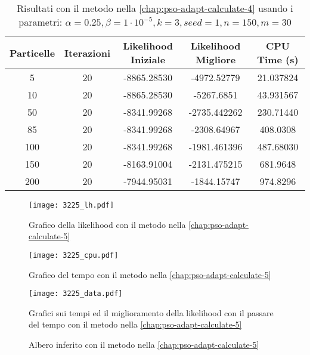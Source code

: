 \begin{table}[!h]
  \centering
  \begin{tabular}{*{5}{c}}
    Particelle & Iterazioni & Likelihood Iniziale & Likelihood Migliore & CPU Time (s) \\ \midrule \midrule
    5 & 20 & -8865.28530 & -4972.52779 & 21.037824 \\
    10 & 20 & -8865.28530 & -5267.6851 & 43.931567 \\
    50 & 20 & -8341.99268 & -2735.442262 & 230.71440 \\
    85 & 20 & -8341.99268 & -2308.64967 & 408.0308 \\
    100 & 20 & -8341.99268 & -1981.461396 & 487.68030 \\
    150 & 20 & -8163.91004 & -2131.475215 & 681.9648 \\
    200 & 20 & -7944.95031 & -1844.15747 & 974.8296 \\
  \end{tabular}
  \caption{Risultati con il metodo nella \autoref{chap:pso-adapt-calculate-4} usando i parametri: $\alpha = 0.25, \beta = 1\cdot 10^{-5}, k = 3, seed = 1, n = 150, m = 30$}
  \label{tab:pso-adapt-calculate-5-table}
\end{table}

\begin{figure}[!h]
  \centering
  \begin{minipage}{.45 \textwidth}
  \centering
  \texttt{[image: 3225\_lh.pdf]}
  \caption{Grafico della likelihood con il metodo nella \autoref{chap:pso-adapt-calculate-5}}
  \end{minipage}
  \begin{minipage}{.45 \textwidth}
    \centering
    \texttt{[image: 3225\_cpu.pdf]}
    \caption{Grafico del tempo con il metodo nella \autoref{chap:pso-adapt-calculate-5}}
  \end{minipage}
  \label{fig:pso-adapt-calculate-1-graph}
\end{figure}

\begin{figure}[!h]
  \centering
  \texttt{[image: 3225\_data.pdf]}
  \caption{Grafici sui tempi ed il miglioramento della likelihood con il passare del tempo con il metodo nella \autoref{chap:pso-adapt-calculate-5}}
  \label{fig:pso-adapt-calculate-4-data}
\end{figure}

\begin{figure}[!h]
  \centering
  \caption{Albero inferito con il metodo nella \autoref{chap:pso-adapt-calculate-5}}
  \label{fig:pso-adapt-calculate-5-tree}
\end{figure}


